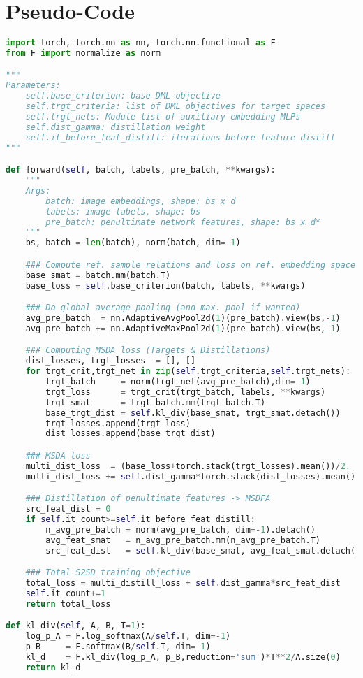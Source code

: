 \documentclass{article} \usepackage{arxiv_style,times}
\begin{document}
\newpage
\section{Pseudo-Code}\label{supp:pseudo_code}
\begin{lstlisting}[language=Python, morekeywords={self,nn,norm,F}, caption=PyTorch Implementation for \textit{S2SD}.]
import torch, torch.nn as nn, torch.nn.functional as F
from F import normalize as norm

"""
Parameters:
    self.base_criterion: base DML objective
    self.trgt_criteria: list of DML objectives for target spaces
    self.trgt_nets: Module list of auxiliary embedding MLPs
    self.dist_gamma: distillation weight
    self.it_before_feat_distill: iterations before feature distill  
"""

def forward(self, batch, labels, pre_batch, **kwargs):
    """
    Args:
        batch: image embeddings, shape: bs x d
        labels: image labels, shape: bs
        pre_batch: penultimate network features, shape: bs x d*
    """
    bs, batch = len(batch), norm(batch, dim=-1)

    ### Compute ref. sample relations and loss on ref. embedding space
    base_smat = batch.mm(batch.T)
    base_loss = self.base_criterion(batch, labels, **kwargs)

    ### Do global average pooling (and max. pool if wanted)
    avg_pre_batch  = nn.AdaptiveAvgPool2d(1)(pre_batch).view(bs,-1)
    avg_pre_batch += nn.AdaptiveMaxPool2d(1)(pre_batch).view(bs,-1)

    ### Computing MSDA loss (Targets & Distillations)
    dist_losses, trgt_losses  = [], []
    for trgt_crit,trgt_net in zip(self.trgt_criteria,self.trgt_nets):
        trgt_batch     = norm(trgt_net(avg_pre_batch),dim=-1)
        trgt_loss      = trgt_crit(trgt_batch, labels, **kwargs)
        trgt_smat      = trgt_batch.mm(trgt_batch.T)
        base_trgt_dist = self.kl_div(base_smat, trgt_smat.detach())
        trgt_losses.append(trgt_loss)
        dist_losses.append(base_trgt_dist)

    ### MSDA loss
    multi_dist_loss  = (base_loss+torch.stack(trgt_losses).mean())/2.
    multi_dist_loss += self.dist_gamma*torch.stack(dist_losses).mean()

    ### Distillation of penultimate features -> MSDFA 
    src_feat_dist = 0
    if self.it_count>=self.it_before_feat_distill:
        n_avg_pre_batch = norm(avg_pre_batch, dim=-1).detach()
        avg_feat_smat   = n_avg_pre_batch.mm(n_avg_pre_batch.T)
        src_feat_dist   = self.kl_div(base_smat, avg_feat_smat.detach())

    ### Total S2SD training objective 
    total_loss = multi_distill_loss + self.dist_gamma*src_feat_dist
    self.it_count+=1
    return total_loss

def kl_div(self, A, B, T=1):
    log_p_A = F.log_softmax(A/self.T, dim=-1)
    p_B     = F.softmax(B/self.T, dim=-1)
    kl_d    = F.kl_div(log_p_A, p_B,reduction='sum')*T**2/A.size(0)
    return kl_d
\end{lstlisting}
\end{document}
